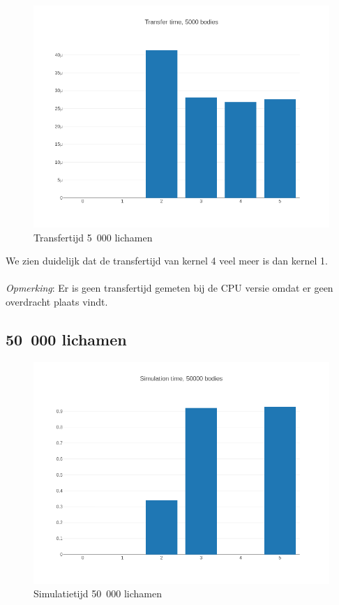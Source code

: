 \documentclass{article}
\begin{document}
\begin{figure}[H]
    \includegraphics[width=\linewidth]{./grafiekskes/hist_transfer5000.png}
    \caption{Transfertijd 5~000 lichamen}
\end{figure}


We zien duidelijk dat de transfertijd van kernel 4 veel meer is dan kernel 1.
\\
\\
\textit{Opmerking}: Er is geen transfertijd gemeten bij de CPU versie omdat er geen overdracht plaats vindt.

\subsection{50~000 lichamen}
\begin{figure}[H]
    \includegraphics[width=\linewidth]{./grafiekskes/hist_simulation50000.png}
    \caption{Simulatietijd 50~000 lichamen}
\end{figure}
\end{document}
